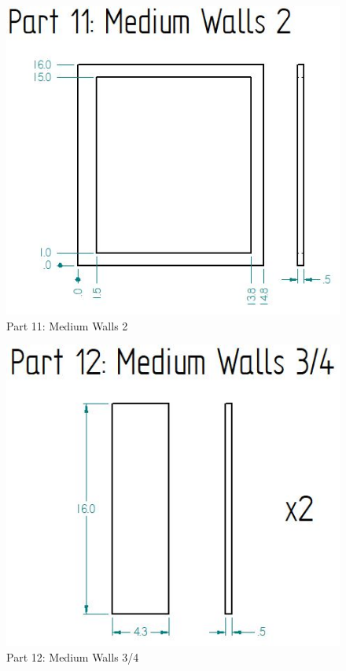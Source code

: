 \documentclass[12pt, titlepage]{article}
\begin{document}
\begin{figure}[H]
    \centerline{\includegraphics[scale=.5]{Part 11.jpg}}
    \caption{Part 11: Medium Walls 2}
    \label{fig}
\end{figure}

\begin{figure}[H]
    \centerline{\includegraphics[scale=.5]{Part 12.jpg}}
    \caption{Part 12: Medium Walls 3/4}
    \label{fig}
\end{figure}
\end{document}

